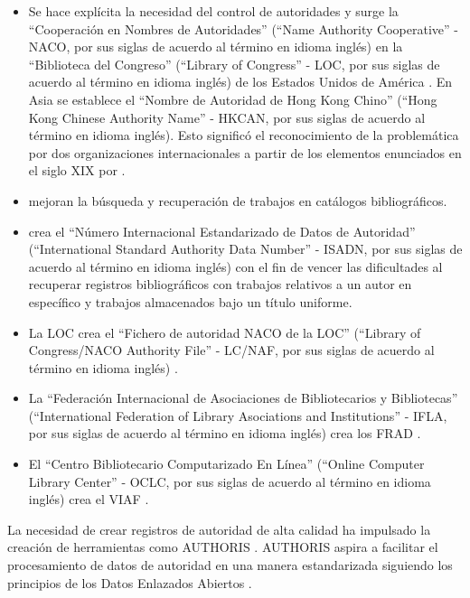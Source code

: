 \begin{itemize}
\item Se hace explícita la necesidad del control de autoridades y surge la ``Cooperación en Nombres de Autoridades'' (``Name Authority Cooperative'' - NACO, por sus siglas de acuerdo al término en idioma inglés) en la ``Biblioteca del Congreso'' (``Library of Congress'' - LOC, por sus siglas de acuerdo al término en idioma inglés) de los Estados Unidos de América \citep{Leiva-Mederos2013}. En Asia se establece el ``Nombre de Autoridad de Hong Kong Chino'' (``Hong Kong Chinese Authority Name'' - HKCAN, por sus siglas de acuerdo al término en idioma inglés). Esto significó el reconocimiento de la problemática por dos organizaciones internacionales a partir de los elementos enunciados en el siglo XIX por \cite{cutter1889rules}.

\item \cite{lubetzky1969principles} mejoran la búsqueda y recuperación de trabajos en catálogos bibliográficos.

\item \cite{bregzis1982syndetic} crea el ``Número Internacional Estandarizado de Datos de Autoridad'' (``International Standard Authority Data Number'' - ISADN, por sus siglas de acuerdo al término en idioma inglés) con el fin de vencer las dificultades al recuperar registros bibliográficos con trabajos relativos a un autor en específico y trabajos almacenados bajo un título uniforme.

\item La LOC crea el ``Fichero de autoridad NACO de la LOC'' (``Library of Congress/NACO Authority File'' - LC/NAF, por sus siglas de acuerdo al término en idioma inglés) \citep{Sandberg2016}.

\item La ``Federación Internacional de Asociaciones de Bibliotecarios y Bibliotecas'' (``International Federation of Library Asociations and Institutions'' - IFLA, por sus siglas de acuerdo al término en idioma inglés) crea los FRAD \citep{InternationalFederationofLibraryAssociationsandInstitutions2009}.

\item El ``Centro Bibliotecario Computarizado En Línea'' (``Online Computer Library Center'' - OCLC, por sus siglas de acuerdo al término en idioma inglés) crea el VIAF \citep{OCLCOnlineComputerLibraryCenterInc.2014}.
\end{itemize}

La necesidad de crear registros de autoridad de alta calidad ha impulsado la creación de herramientas como AUTHORIS \citep{Leiva-Mederos2013}. AUTHORIS aspira a facilitar el procesamiento de datos de autoridad en una manera estandarizada siguiendo los principios de los Datos Enlazados Abiertos \citep{Berners-Lee2006}.

